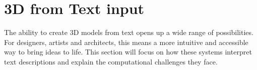 \section{3D from Text input}\label{3d from text}

The ability to create 3D models from text opens up a wide range of possibilities. For designers, artists and architects, this means a more intuitive and accessible way to bring ideas to life. This section will focus on how these systems interpret text descriptions and explain the computational challenges they face.




